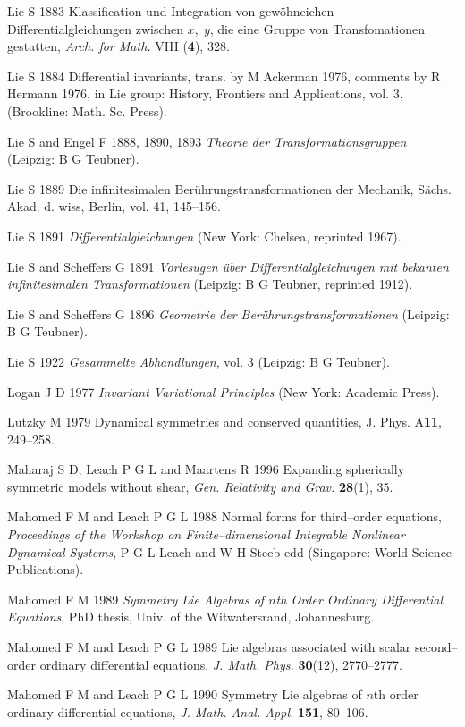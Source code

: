 Lie S 1883  Klassification und Integration von
gew\"ohneichen Differentialgleichungen zwischen $x,\;y$, die eine Gruppe
von Transfomationen gestatten, {\em Arch. for Math.} VIII ({\bf 4}), 328.

Lie S 1884  Differential invariants, trans. by
M Ackerman 1976, comments by R Hermann 1976, in Lie group: History,
Frontiers and Applications, vol. 3, (Brookline: Math. Sc. Press). 

Lie S and Engel F 1888, 1890, 1893 {\em Theorie der
Transformationsgruppen} (Leipzig: B G Teubner).

Lie S 1889 Die infinitesimalen Ber\"uhrungstransformationen
der Mechanik, S\"achs. Akad. d. wiss, Berlin, vol. 41, 145--156.

Lie S 1891 {\em Differentialgleichungen} (New York: Chelsea, reprinted 1967).

Lie S and  Scheffers G 1891 {\em Vorlesugen \"uber
Differentialgleichungen mit bekanten infinitesimalen Transformationen}
(Leipzig: B G Teubner, reprinted 1912).


Lie S and Scheffers G 1896
{\em  Geometrie der Ber\"uhrungstransformationen} (Leipzig: B G Teubner).

Lie S  1922 {\em Gesammelte Abhandlungen}, vol. 3 (Leipzig: B G Teubner).

Logan J D  1977 {\em Invariant Variational Principles}
(New York: Academic Press).

Lutzky M 1979 Dynamical symmetries and conserved quantities,
{J. Phys. A}{\bf 11}, 249--258.

Maharaj S D, Leach P G L and Maartens R 1996 Expanding
spherically symmetric models without shear, {\em Gen. Relativity and Grav.}
{\bf28}(1), 35.

Mahomed F M and  Leach P G L 1988 Normal forms for third--order equations,
{\em Proceedings of the Workshop on Finite--dimensional Integrable
Nonlinear Dynamical Systems}, P G L Leach and W H Steeb edd
(Singapore: World Science Publications).

Mahomed F M 1989 {\em Symmetry Lie Algebras of $n$th
Order Ordinary Differential Equations}, PhD thesis, Univ. of the
Witwatersrand, Johannesburg.

Mahomed F M and Leach P G L 1989  Lie algebras associated with scalar
second--order ordinary differential equations, {\em J. Math. Phys.}
{\bf 30}(12), 2770--2777.

Mahomed F M and Leach P G L 1990
Symmetry Lie algebras of $n$th order ordinary differential equations,
{\em J. Math. Anal. Appl.} {\bf 151}, 80--106.

